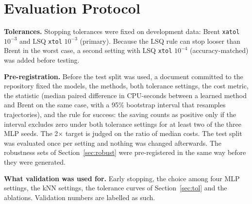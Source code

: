 \section{Evaluation Protocol}
\textbf{Tolerances.} Stopping tolerances were fixed on development data: Brent \texttt{xatol} $10^{-3}$ and
LSQ \texttt{xtol} $10^{-3}$ (primary). Because the LSQ rule can stop looser than Brent in the worst case, a
second setting with LSQ \texttt{xtol} $10^{-4}$ (accuracy-matched) was added before testing.

\textbf{Pre-registration.} Before the test split was used, a document committed to the
repository %
fixed the models, the methods, both tolerance settings, the cost metric, the statistic (median paired
difference in CPU-seconds between a learned method and Brent on the same case, with a 95\% bootstrap interval
that resamples trajectories), and the rule for success: the saving counts as positive only if the interval
excludes zero under both tolerance settings for at least two of the three MLP seeds. The 2$\times$ target is
judged on the ratio of median costs. The test split was evaluated once per setting and nothing was changed
afterwards. The robustness sets of Section~\ref{sec:robust} were pre-registered in the same way before they
were generated. %

\textbf{What validation was used for.} Early stopping, the choice among four MLP settings, the kNN settings,
the tolerance curves of Section~\ref{sec:tol} and the ablations. Validation numbers are labelled as such.
